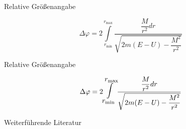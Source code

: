\documentclass[
	vorläufig=false,
	datum=2022-11-02,
	titel={Mathematiksatz II},
	web=true,
	max,
	aspectratio=1610,
]{../tex/latexkurs-slides}
\begin{document}
\begin{frame}[fragile]{Relative Größenangabe}
\begin{LTXexample}[pos=b]
\[\Delta \varphi = 2
\int\limits_{r_{\min}}^{r_{\max}} \frac{ \dfrac{M}{r^2} dr} 
{\sqrt{2m (E-U) - \dfrac{M^2}{r^2}}}
\]
\end{LTXexample}
\end{frame}

\begin{frame}[fragile]{Relative Größenangabe}
\begin{LTXexample}[pos=b]
\newcommand\largeint{\mathlarger{\mathlarger{\mathlarger{\int}}}}
\[\Delta \varphi = 2
\largeint\limits_{r_{\min}}^{r_{\max}} \frac{ \dfrac{M}{r^2} dr} 
{\sqrt{2m (E-U) - \dfrac{M^2}{r^2}}}
\]
\end{LTXexample}
\end{frame}

\nocite{wikibooksmaths,amsthm, siunitx, gnuplottex, mathmode}
\begin{frame}[allowframebreaks]{Weiterführende Literatur}
\printbibliography
\end{frame}


\end{document}
